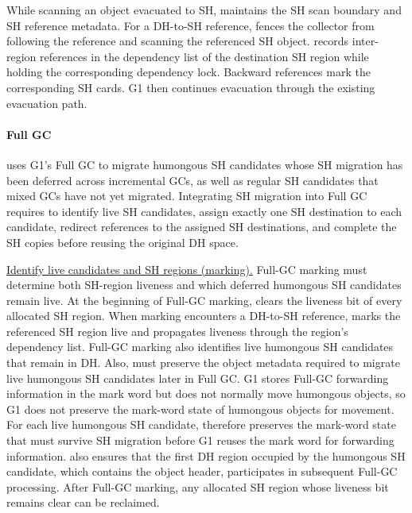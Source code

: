 While scanning an object evacuated to SH, \chipperName{} maintains the SH scan boundary and SH reference metadata.
For a DH-to-SH reference, \chipperName{} fences the collector from following the reference and scanning the referenced SH object.
\chipperName{} records inter-region references in the dependency list of the destination SH region while holding the corresponding dependency lock.
Backward references mark the corresponding SH cards.
G1 then continues evacuation through the existing evacuation path.

\paragraph{\textbf{Full GC}}
\chipperName{} uses G1's Full GC to migrate humongous SH candidates whose SH migration has been deferred across incremental GCs, as well as regular SH candidates that mixed GCs have not yet migrated.
Integrating SH migration into Full GC requires \chipperName{} to identify live SH candidates, assign exactly one SH destination to each candidate, redirect references to the assigned SH destinations, and complete the SH copies before reusing the original DH space.

\underline{Identify live candidates and SH regions (marking).}
Full-GC marking must determine both SH-region liveness and which deferred humongous SH candidates remain live.
At the beginning of Full-GC marking, \chipperName{} clears the liveness bit of every allocated SH region.
When marking encounters a DH-to-SH reference, \chipperName{} marks the referenced SH region live and propagates liveness through the region's dependency list.
Full-GC marking also identifies live humongous SH candidates that remain in DH.
Also, \chipperName{} must preserve the object metadata required to migrate live humongous SH candidates later in Full GC.
G1 stores Full-GC forwarding information in the mark word but does not normally move humongous objects, so G1 does not preserve the mark-word state of humongous objects for movement.
For each live humongous SH candidate, \chipperName{} therefore preserves the mark-word state that must survive SH migration before G1 reuses the mark word for forwarding information.
\chipperName{} also ensures that the first DH region occupied by the humongous SH candidate, which contains the object header, participates in subsequent Full-GC processing.
After Full-GC marking, any allocated SH region whose liveness bit remains clear can be reclaimed.

